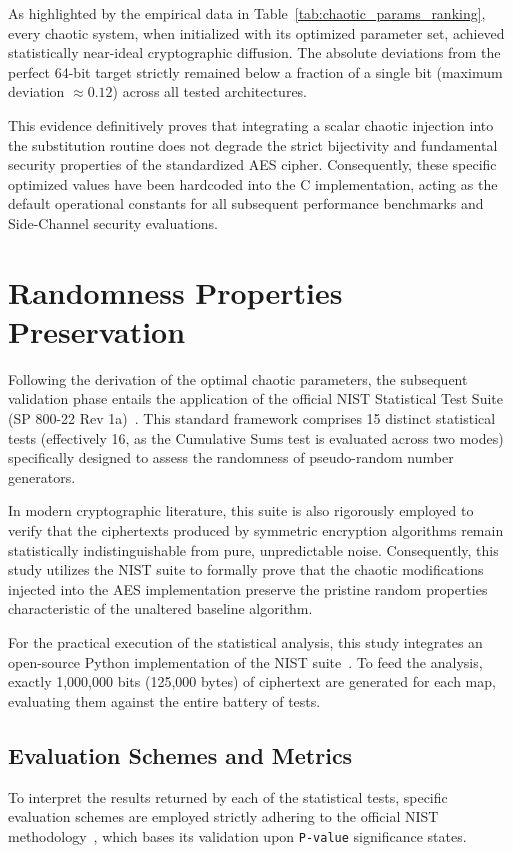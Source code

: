 \documentclass[11pt,a4paper]{report}
\begin{document}
As highlighted by the empirical data in Table~\ref{tab:chaotic_params_ranking}, every chaotic system, when initialized with its optimized parameter set, achieved statistically near-ideal cryptographic diffusion. 
The absolute deviations from the perfect 64-bit target strictly remained below a fraction of a single bit (maximum deviation $\approx 0.12$) across all tested architectures. 

This evidence definitively proves that integrating a scalar chaotic injection into the substitution routine does not degrade the strict bijectivity and fundamental security properties of the standardized AES cipher. 
Consequently, these specific optimized values have been hardcoded into the C implementation, acting as the default operational constants for all subsequent performance benchmarks and Side-Channel security evaluations.


\section{Randomness Properties Preservation}
Following the derivation of the optimal chaotic parameters, the subsequent validation phase entails the application of the official NIST Statistical Test Suite (SP 800-22 Rev 1a)~\cite{NISTRandomnessTestSuite}. 
This standard framework comprises 15 distinct statistical tests (effectively 16, as the Cumulative Sums test is evaluated across two modes) specifically designed to assess the randomness of pseudo-random number generators. 

In modern cryptographic literature, this suite is also rigorously employed to verify that the ciphertexts produced by symmetric encryption algorithms remain statistically indistinguishable from pure, unpredictable noise. 
Consequently, this study utilizes the NIST suite to formally prove that the chaotic modifications injected into the AES implementation preserve the pristine random properties characteristic of the unaltered baseline algorithm.

For the practical execution of the statistical analysis, this study integrates an open-source Python implementation of the NIST suite~\cite{stevenang2020randomness_testsuite}. 
To feed the analysis, exactly 1,000,000 bits (125,000 bytes) of ciphertext are generated for each map, evaluating them against the entire battery of tests.

\subsection{Evaluation Schemes and Metrics}
To interpret the results returned by each of the statistical tests, specific evaluation schemes are employed strictly adhering to the official NIST methodology~\cite{NISTRandomnessTestSuite}, 
which bases its validation upon \texttt{P-value} significance states. 
\end{document}
